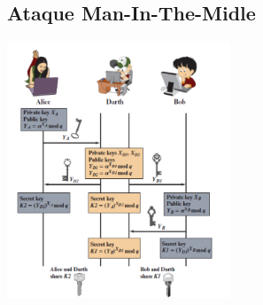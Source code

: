 \documentclass[11pt,a4paper]{article}
\begin{document}
\subsection*{Ataque Man-In-The-Midle}
\begin{center}
    \includegraphics[width=0.5\textwidth]{resources/MITM-Diffie-Hellman.png}
\end{center}
\end{document}
